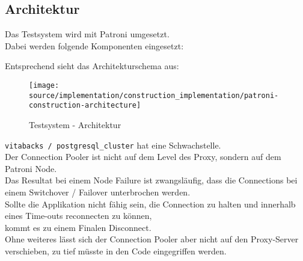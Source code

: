 
\begin{flushleft}
    \subsection{Architektur}
    Das Testsystem wird mit Patroni umgesetzt.\\
    Dabei werden folgende Komponenten eingesetzt:\\
    
\end{flushleft}
\begin{flushleft}
    Entsprechend sieht das Architekturschema aus:
    \begin{figure}[H]
        \centering
        \texttt{[image: source/implementation/construction\_implementation/patroni-construction-architecture]}
        \caption{Testsystem - Architektur}
        \label{fig:patroni-construction-architecture}
    \end{figure}
\end{flushleft}
\begin{flushleft}
    \texttt{vitabacks / postgresql\_cluster} hat eine Schwachstelle.\\
    Der \Gls{Connection Pooler} ist nicht auf dem Level des Proxy, sondern auf dem Patroni Node.\\
    Das Resultat bei einem Node Failure ist zwangsläufig, dass die Connections bei einem \Gls{Switchover} / \Gls{Failover} unterbrochen werden.\\
    Sollte die Applikation nicht fähig sein, die Connection zu halten und innerhalb eines Time-outs reconnecten zu können,\\
    kommt es zu einem Finalen Disconnect.\\
    Ohne weiteres lässt sich der \Gls{Connection Pooler} aber nicht auf den Proxy-Server verschieben, zu tief müsste in den Code eingegriffen werden.
\end{flushleft}